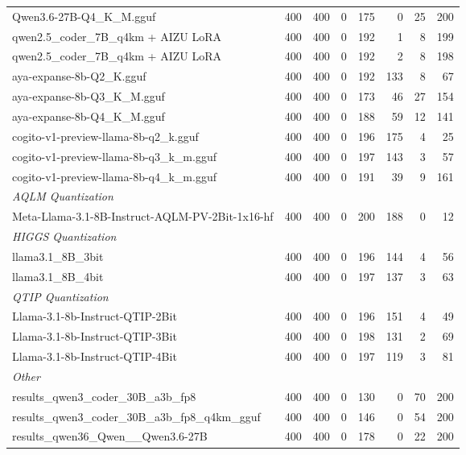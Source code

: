 \begin{table}[htbp]
{\begin{tabular}{lrrrrrrr}
    Qwen3.6-27B-Q4\_K\_M.gguf & 400 & 400 & 0 & 175 & 0 & 25 & 200 \\
    qwen2.5\_coder\_7B\_q4km + AIZU LoRA & 400 & 400 & 0 & 192 & 1 & 8 & 199 \\
    qwen2.5\_coder\_7B\_q4km + AIZU LoRA & 400 & 400 & 0 & 192 & 2 & 8 & 198 \\
    aya-expanse-8b-Q2\_K.gguf & 400 & 400 & 0 & 192 & 133 & 8 & 67 \\
    aya-expanse-8b-Q3\_K\_M.gguf & 400 & 400 & 0 & 173 & 46 & 27 & 154 \\
    aya-expanse-8b-Q4\_K\_M.gguf & 400 & 400 & 0 & 188 & 59 & 12 & 141 \\
    cogito-v1-preview-llama-8b-q2\_k.gguf & 400 & 400 & 0 & 196 & 175 & 4 & 25 \\
    cogito-v1-preview-llama-8b-q3\_k\_m.gguf & 400 & 400 & 0 & 197 & 143 & 3 & 57 \\
    cogito-v1-preview-llama-8b-q4\_k\_m.gguf & 400 & 400 & 0 & 191 & 39 & 9 & 161 \\
    \midrule
    \multicolumn{8}{l}{\textit{AQLM Quantization}} \\
    \midrule
    Meta-Llama-3.1-8B-Instruct-AQLM-PV-2Bit-1x16-hf & 400 & 400 & 0 & 200 & 188 & 0 & 12 \\
    \midrule
    \multicolumn{8}{l}{\textit{HIGGS Quantization}} \\
    \midrule
    llama3.1\_8B\_3bit & 400 & 400 & 0 & 196 & 144 & 4 & 56 \\
    llama3.1\_8B\_4bit & 400 & 400 & 0 & 197 & 137 & 3 & 63 \\
    \midrule
    \multicolumn{8}{l}{\textit{QTIP Quantization}} \\
    \midrule
    Llama-3.1-8b-Instruct-QTIP-2Bit & 400 & 400 & 0 & 196 & 151 & 4 & 49 \\
    Llama-3.1-8b-Instruct-QTIP-3Bit & 400 & 400 & 0 & 198 & 131 & 2 & 69 \\
    Llama-3.1-8b-Instruct-QTIP-4Bit & 400 & 400 & 0 & 197 & 119 & 3 & 81 \\
    \midrule
    \multicolumn{8}{l}{\textit{Other}} \\
    \midrule
    results\_qwen3\_coder\_30B\_a3b\_fp8 & 400 & 400 & 0 & 130 & 0 & 70 & 200 \\
    results\_qwen3\_coder\_30B\_a3b\_fp8\_q4km\_gguf & 400 & 400 & 0 & 146 & 0 & 54 & 200 \\
    results\_qwen36\_Qwen\_\_Qwen3.6-27B & 400 & 400 & 0 & 178 & 0 & 22 & 200 \\
    \bottomrule
  \end{tabular}
  }
\end{table}

